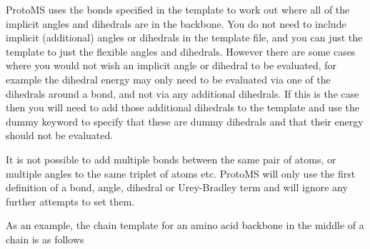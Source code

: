 \documentclass[letterpaper,10pt,english]{sphinxmanual}
\begin{document}
ProtoMS uses the bonds specified in the template to work out where all of the implicit angles and dihedrals are in the backbone. You do not need to include implicit (additional) angles or dihedrals in the template file, and you can just the template to just the flexible angles and dihedrals. However there are some cases where you would not wish an implicit angle or dihedral to be evaluated, for example the dihedral energy may only need to be evaluated via one of the dihedrals around a bond, and not via any additional dihedrals. If this is the case then you will need to add those additional dihedrals to the template and use the dummy keyword to specify that these are dummy dihedrals and that their energy should not be evaluated.

It is not possible to add multiple bonds between the same pair of atoms, or multiple angles to the same triplet of atoms etc. ProtoMS will only use the first definition of a bond, angle, dihedral or Urey-Bradley term and will ignore any further attempts to set them.

As an example, the chain template for an amino acid backbone in the middle of a chain is as follows
\end{document}
